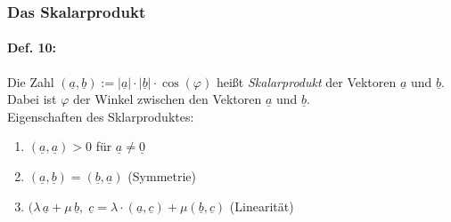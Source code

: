 \subsubsection{Das Skalarprodukt}
\paragraph{Def. 10:} \parskp
Die Zahl $(\underline{a}, \underline{b}):=|\underline{a}|\cdot |\underline{b}|\cdot \cos(\varphi)$ heißt \emph{Skalarprodukt} der Vektoren $\underline{a}$ und $\underline{b}$. Dabei ist $\varphi$ der Winkel zwischen den Vektoren $\underline{a}$ und $\underline{b}$.\medskip\\
Eigenschaften des Sklarproduktes:
\begin{enumerate}[label=\alph*.)]
\item $(\underline{a}, \underline{a})>0$ für $\underline{a}\not = \underline{0}$
\item $(\underline{a}, \underline{b})=(\underline{b}, \underline{a})$ (Symmetrie)
\item $(\lambda\, \underline{a}+\mu\, \underline{b},\; \underline{c}=\lambda\cdot (\underline{a}, \underline{c})+\mu(\underline{b}, \underline{c})$ (Linearität)
\end{enumerate}

